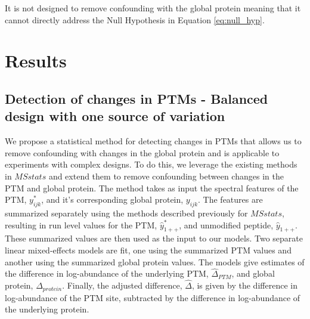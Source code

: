 \documentclass[mcp]{article}
\numberwithin{table}{section}
\begin{document}
It is not designed to remove confounding with the global protein meaning that it cannot directly address the Null Hypothesis in Equation \ref{eq:null_hyp}.




\section{Results}

\subsection*{Detection of changes in PTMs - Balanced design with one source of variation}
\label{sec:adjustment_summary}

We propose a statistical method for detecting changes in PTMs that allows us to remove confounding with changes in the global protein and is applicable to experiments with complex designs.   To do this, we leverage the existing methods in $MSstats$ and extend them to remove confounding between changes in the PTM and global protein. The method takes as input the spectral features of the PTM, $y_{ijk}^{\ast}$, and it's corresponding global protein, $y_{ijk}$. The features are summarized separately using the methods described previously for $MSstats$, resulting in run level values for the PTM, $\hat{y}_{1++}^{\ast}$, and unmodified peptide, $\hat{y}_{1++}$. These summarized values are then used as the input to our models. Two separate linear mixed-effects models are fit, one using the summarized PTM values and another using the summarized global protein values. The models give estimates of the difference in log-abundance of the underlying PTM, $\hat{\Delta}_{PTM}$, and global protein, $\hat{\Delta}_{protein}$. Finally, the adjusted difference, $\hat{\Delta}$, is given by the difference in log-abundance of the PTM site, subtracted by the difference in log-abundance of the underlying protein. 
\end{document}
